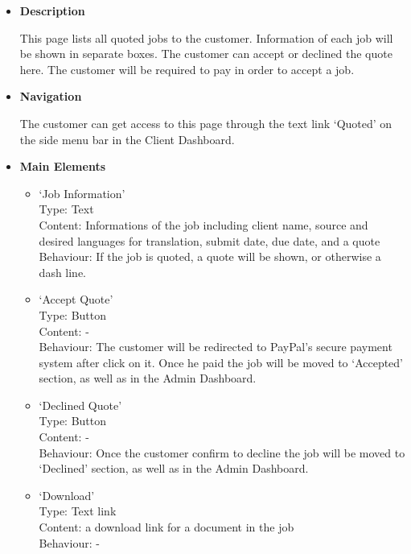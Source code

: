 \documentclass{l3proj}
\begin{document}
\begin{itemize}
\item \textbf{Description}

This page lists all quoted jobs to the customer. Information of each job will be shown in separate boxes. 
The customer can accept or declined the quote here. The customer will be required to pay in order to accept a job.

\item \textbf{Navigation}

The customer can get access to this page through the text link `Quoted' on the side menu bar in the Client Dashboard.

\item \textbf{Main Elements}
\begin{itemize}

\item `Job Information'\\
Type: Text\\
Content: Informations of the job including client name, source and desired languages for translation, submit date, due date, and a quote \\
Behaviour: If the job is quoted, a quote will be shown, or otherwise a dash line. \\

\item `Accept Quote'\\
Type: Button\\
Content: -\\
Behaviour: The customer will be redirected to PayPal's secure payment system after click on it. Once he paid the job will be moved to `Accepted' section, as well as in the Admin Dashboard.\\

\item `Declined Quote'\\
Type: Button\\
Content: -\\
Behaviour: Once the customer confirm to decline the job will be moved to `Declined' section, as well as in the Admin Dashboard.\\

\item `Download'\\
Type: Text link\\
Content: a download link for a document in the job\\
Behaviour: -\\

\end{itemize}
\end{itemize}
\end{document}
